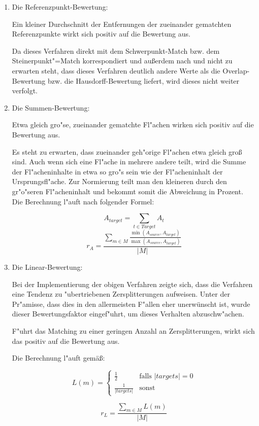 \begin{enumerate}
\item Die Referenzpunkt-Bewertung:

Ein kleiner Durchschnitt der Entfernungen der zueinander gematchten Referenzpunkte wirkt sich positiv auf die Bewertung aus.

Da dieses Verfahren direkt mit dem Schwerpunkt-Match bzw. dem Steinerpunkt"=Match korrespondiert und außerdem nach \cite{AFRW} und \cite{AAR} nicht zu erwarten steht, dass dieses Verfahren deutlich andere Werte als die Overlap-Bewertung bzw. die Hausdorff-Bewertung liefert, wird dieses nicht weiter verfolgt.

\item Die Summen-Bewertung:


Etwa gleich gro"se, zueinander gematchte Fl"achen wirken sich positiv auf die Bewertung aus.

Es steht zu erwarten, dass zueinander geh"orige Fl"achen etwa gleich groß sind. Auch wenn sich eine Fl"ache in mehrere andere teilt, wird die Summe der Fl"acheninhalte in etwa so gro"s sein wie der Fl"acheninhalt der Ursprungsfl"ache. Zur Normierung teilt man den kleineren durch den gr"o"seren Fl"acheninhalt und bekommt somit die Abweichung in Prozent. Die Berechnung l"auft nach folgender Formel:

$$A_{target}=\sum_{t\in Target}A_t$$
$$r_A=\frac {\sum_{m\in M}\frac{\min({A_{source},A_{target}})}{\max({A_{source},A_{target}})}}{|M|}$$



\item Die Linear-Bewertung:

Bei der Implementierung der obigen Verfahren zeigte sich, dass die Verfahren eine Tendenz zu "ubertriebenen Zersplitterungen aufweisen. Unter der Pr"amisse, dass dies in den allermeisten F"allen eher unerwünscht ist, wurde dieser Bewertungsfaktor eingef"uhrt, um dieses Verhalten abzuschw"achen.

F"uhrt das Matching zu einer geringen Anzahl an Zersplitterungen, wirkt sich das positiv auf die Bewertung aus.

Die Berechnung l"auft gemäß:

$$L(m)=
\begin{cases}
	\frac{1}{2} & \text{falls }|targets|=0\\
	\frac{1}{|targets|} & \text{sonst}
    \end{cases}
$$

$$r_L=\frac{\sum_{m\in M}L(m)}{|M|}$$


\end{enumerate}
